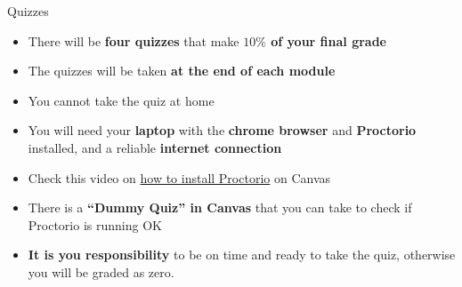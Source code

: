 \documentclass[9pt]{beamer}
\begin{document}
\begin{frame}{Quizzes}

    \begin{itemize}[leftmargin = 0.5cm, label = $\bullet$]

    \item There will be \textbf{four quizzes} that make \textbf{$10\%$ of your final grade} \medskip

    \item The quizzes will be taken \textbf{at the end of each module}\medskip

    \item You cannot take the quiz at home\medskip

    \item You will need your \textbf{laptop} with the \textbf{chrome browser} and \textbf{Proctorio} installed, and a reliable \textbf{internet connection} \medskip

    \item Check this video on \href{https://www.youtube.com/watch?v=GpYY2GSPfp8}{how to install Proctorio} on Canvas\medskip

    \item There is a \textbf{``Dummy Quiz'' in Canvas} that you can take to check if Proctorio is running OK \medskip

    \item \textbf{It is you responsibility} to be on time and ready to take the quiz, otherwise you will be graded as zero.

    \end{itemize}
    
\end{frame}


    
\end{document}
